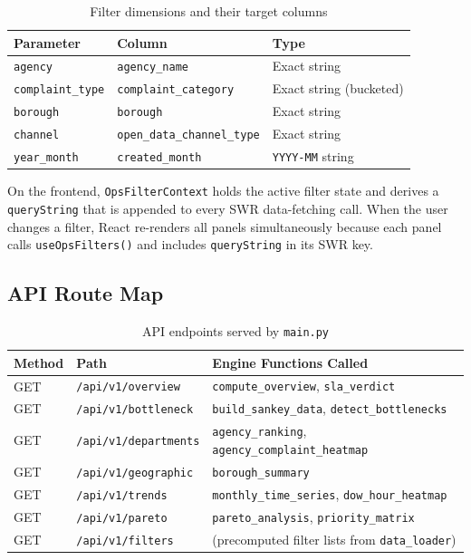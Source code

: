 \begin{table}[h]
\centering
\caption{Filter dimensions and their target columns}
\label{tab:ops-filters}
\begin{tabular}{lll}
\toprule
\textbf{Parameter} & \textbf{Column} & \textbf{Type} \\
\midrule
\texttt{agency} & \texttt{agency\_name} & Exact string \\
\texttt{complaint\_type} & \texttt{complaint\_category} & Exact string (bucketed) \\
\texttt{borough} & \texttt{borough} & Exact string \\
\texttt{channel} & \texttt{open\_data\_channel\_type} & Exact string \\
\texttt{year\_month} & \texttt{created\_month} & \texttt{YYYY-MM} string \\
\bottomrule
\end{tabular}
\end{table}

On the frontend, \texttt{OpsFilterContext} holds the active filter state and derives a \texttt{queryString} that is appended to every SWR data-fetching call. When the user changes a filter, React re-renders all panels simultaneously because each panel calls \texttt{useOpsFilters()} and includes \texttt{queryString} in its SWR key.

\subsection{API Route Map}

\begin{table}[h]
\centering
\caption{API endpoints served by \texttt{main.py}}
\label{tab:ops-api-routes}
\begin{tabular}{lll}
\toprule
\textbf{Method} & \textbf{Path} & \textbf{Engine Functions Called} \\
\midrule
GET & \texttt{/api/v1/overview} & \texttt{compute\_overview}, \texttt{sla\_verdict} \\
GET & \texttt{/api/v1/bottleneck} & \texttt{build\_sankey\_data}, \texttt{detect\_bottlenecks} \\
GET & \texttt{/api/v1/departments} & \texttt{agency\_ranking}, \texttt{agency\_complaint\_heatmap} \\
GET & \texttt{/api/v1/geographic} & \texttt{borough\_summary} \\
GET & \texttt{/api/v1/trends} & \texttt{monthly\_time\_series}, \texttt{dow\_hour\_heatmap} \\
GET & \texttt{/api/v1/pareto} & \texttt{pareto\_analysis}, \texttt{priority\_matrix} \\
GET & \texttt{/api/v1/filters} & (precomputed filter lists from \texttt{data\_loader}) \\
\bottomrule
\end{tabular}
\end{table}

